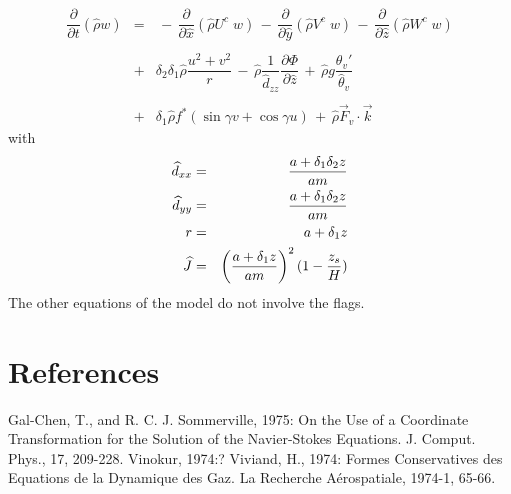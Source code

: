 \begin{eqnarray}
\\
& & \nonumber \\
\dfrac{\partial}{\partial t}(\widehat{\rho} w) &= &
 \, - \, \dfrac{\partial }{\partial \widehat{x}} (\widehat{\rho} U^{c }\;    w)
 \, - \, \dfrac{\partial }{\partial \widehat{y}} (\widehat{\rho} V^{c }\;   w )
 \, - \, \dfrac{\partial }{\partial \widehat{z}} (\widehat{\rho} W^{c }\;  w)
\nonumber \\ & & \nonumber \\
 & + & \delta _{2}\delta _{1}\widehat{\rho}\dfrac{ u ^{2}+ v ^{2} }{r}
 \,  - \, \widehat{\rho}\dfrac{1}{\widehat{d}_{zz}} \dfrac{\partial \Phi}{\partial \widehat{z}}
\, + \,\widehat{\rho} g \dfrac{\theta_v ' }{\widehat{\theta}_v}\nonumber \\
& & \nonumber \\
&  + &\delta _{1}\widehat{\rho} f^{*}(\sin\gamma  v  + \cos\gamma  u )
 \, + \, \widehat{\rho} \vec{F}_{v} \cdot \vec{k}
 \end{eqnarray}
with
\begin{eqnarray}
\widehat{d}_{xx}&=&\dfrac{a+\delta_1 \delta_2 z}{am} \nonumber \\
\widehat{d}_{yy}&=&\dfrac{a+\delta_1 \delta_2 z}{am} \nonumber \\
r &=& a + \delta_1 z \\
\widehat{J} &=& \left( \dfrac{a+\delta_1 z}{am} \right)^2 (1 - {z_s \over H }) \nonumber
\end{eqnarray}
The other equations of the model do not involve the flags.


\section{References}
\por
Gal-Chen, T., and R. C. J. Sommerville, 1975: On the Use of a Coordinate
Transformation for the Solution of the Navier-Stokes Equations. J. Comput.
Phys., 17, 209-228.
\por
Vinokur, 1974:?
\por
Viviand, H., 1974: Formes Conservatives des Equations de la Dynamique des Gaz.
La Recherche A\'erospatiale, 1974-1, 65-66.

